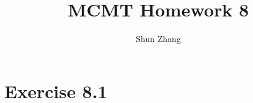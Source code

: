 \documentclass[10pt]{article}
\title{MCMT Homework 8}
\author{Shun Zhang}
\date{}
\begin{document}
\maketitle

\section*{Exercise 8.1}
\end{document}

